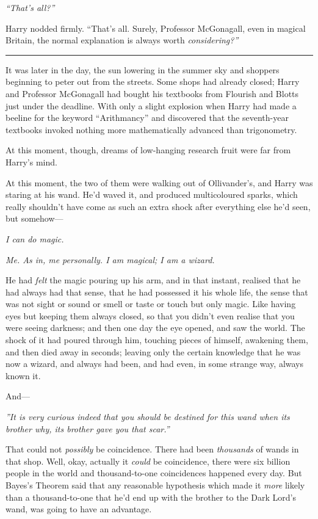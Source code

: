 \emph{``That's all?''}

Harry nodded firmly. ``That's all. Surely, Professor McGonagall, even in
magical Britain, the normal explanation is always worth
\emph{considering?''}

\begin{center}\rule{3in}{0.4pt}\end{center}

It was later in the day, the sun lowering in the summer sky and shoppers
beginning to peter out from the streets. Some shops had already closed;
Harry and Professor McGonagall had bought his textbooks from Flourish
and Blotts just under the deadline. With only a slight explosion when
Harry had made a beeline for the keyword ``Arithmancy'' and discovered
that the seventh-year textbooks invoked nothing more mathematically
advanced than trigonometry.

At this moment, though, dreams of low-hanging research fruit were far
from Harry's mind.

At this moment, the two of them were walking out of Ollivander's, and
Harry was staring at his wand. He'd waved it, and produced multicoloured
sparks, which really shouldn't have come as such an extra shock after
everything else he'd seen, but somehow---

\emph{I can do magic.}

\emph{Me. As in, me personally. I am magical; I am a wizard.}

He had \emph{felt} the magic pouring up his arm, and in that instant,
realised that he had always had that sense, that he had possessed it his
whole life, the sense that was not sight or sound or smell or taste or
touch but only magic. Like having eyes but keeping them always closed,
so that you didn't even realise that you were seeing darkness; and then
one day the eye opened, and saw the world. The shock of it had poured
through him, touching pieces of himself, awakening them, and then died
away in seconds; leaving only the certain knowledge that he was now a
wizard, and always had been, and had even, in some strange way, always
known it.

And---

\emph{''It is very curious indeed that you should be destined for this
wand when its brother why, its brother gave you that scar.''}

That could not \emph{possibly} be coincidence. There had been
\emph{thousands} of wands in that shop. Well, okay, actually it
\emph{could} be coincidence, there were six billion people in the world
and thousand-to-one coincidences happened every day. But Bayes's Theorem
said that any reasonable hypothesis which made it \emph{more} likely
than a thousand-to-one that he'd end up with the brother to the Dark
Lord's wand, was going to have an advantage.

